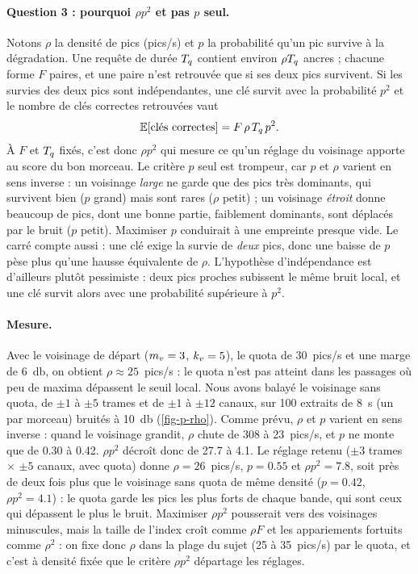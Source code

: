 \paragraph{Question 3 : pourquoi $\rho p^2$ et pas $p$ seul.} Notons $\rho$ la densité de
pics (pics/s) et $p$ la probabilité qu'un pic survive à la dégradation. Une requête de
durée $T_q$ contient environ $\rho T_q$ ancres ; chacune forme $F$ paires, et une paire
n'est retrouvée que si ses deux pics survivent. Si les survies des deux pics sont
indépendantes, une clé survit avec la probabilité $p^2$ et le nombre de clés correctes
retrouvées vaut
\begin{equation}
  \mathbb{E}[\text{clés correctes}] = F\,\rho\,T_q\,p^2 .
  \label{eq-cles-correctes}
\end{equation}
À $F$ et $T_q$ fixés, c'est donc $\rho p^2$ qui mesure ce qu'un réglage du voisinage apporte
au score du bon morceau. Le critère $p$ seul est trompeur, car $p$ et $\rho$ varient en sens
inverse : un voisinage \emph{large} ne garde que des pics très dominants, qui survivent bien
($p$ grand) mais sont rares ($\rho$ petit) ; un voisinage \emph{étroit} donne beaucoup de pics,
dont une bonne partie, faiblement dominants, sont déplacés par le bruit ($p$ petit).
Maximiser $p$ conduirait à une empreinte presque vide. Le carré compte aussi : une clé exige
la survie de \emph{deux} pics, donc une baisse de $p$ pèse plus qu'une hausse équivalente de
$\rho$. L'hypothèse d'indépendance est d'ailleurs plutôt pessimiste : deux pics proches
subissent le même bruit local, et une clé survit alors avec une probabilité supérieure à
$p^2$.

\paragraph{Mesure.} Avec le voisinage de départ ($m_v = 3$, $k_v = 5$), le quota de
30~pics/s et une marge de \qty{6}{\decibel}, on obtient $\rho \approx 25$~pics/s : le quota
n'est pas atteint dans les passages où peu de maxima dépassent le seuil local. Nous avons balayé le voisinage sans quota, de $\pm 1$ à $\pm 5$ trames
et de $\pm 1$ à $\pm 12$ canaux, sur 100 extraits de \qty{8}{\second} (un par morceau)
bruités à \qty{10}{\decibel} (\cref{fig-p-rho}). Comme prévu, $\rho$ et $p$ varient en sens
inverse : quand le voisinage grandit, $\rho$ chute de 308 à 23~pics/s, et $p$ ne monte que
de \num{0.30} à \num{0.42}. $\rho p^2$ décroît donc de \num{27.7} à \num{4.1}. Le réglage
retenu ($\pm 3$ trames $\times$ $\pm 5$ canaux, avec quota) donne $\rho = 26$~pics/s,
$p = \num{0.55}$ et $\rho p^2 = \num{7.8}$, soit près de deux fois plus que le voisinage
sans quota de même densité ($p = \num{0.42}$, $\rho p^2 = \num{4.1}$) : le quota garde les
pics les plus forts de chaque bande, qui sont ceux qui dépassent le plus le bruit.
Maximiser $\rho p^2$ pousserait vers des voisinages minuscules, mais la taille de l'index
croît comme $\rho F$ et les appariements fortuits comme $\rho^2$ : on fixe donc $\rho$ dans
la plage du sujet (25 à 35~pics/s) par le quota, et c'est à densité fixée que le critère
$\rho p^2$ départage les réglages.

